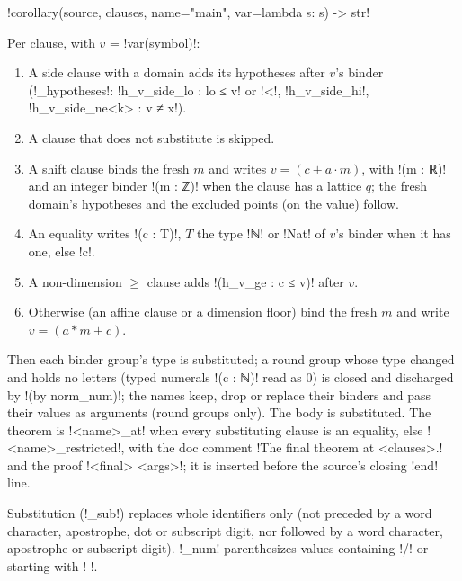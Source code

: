 {{{\begin{signature}
\lexpy!corollary(source, clauses, name="main", var=lambda s: s) -> str!
\end{signature}
\begin{algorithm}\label{alg:lean-export-corollary}
Per clause, with $v$ = \lexcode!var(symbol)!:
\begin{enumerate}
\item A side clause with a domain adds its hypotheses after $v$'s binder (\lexpy!_hypotheses!:
\lexcode!h_v_side_lo : lo ≤ v! or \lexcode!<!, \lexcode!h_v_side_hi!, \lexcode!h_v_side_ne<k> : v ≠ x!).
\item A clause that does not substitute is skipped.
\item A shift clause binds the fresh $m$ and writes $v = (c + a\cdot m)$, with
\lexlean!(m : ℝ)! and an integer binder \lexlean!(m : ℤ)! when the clause has a lattice $q$; the fresh
domain's hypotheses and the excluded points (on the value) follow.
\item An equality writes \lexlean!(c : T)!, $T$ the type \lexlean!ℕ! or \lexlean!Nat! of $v$'s binder when it has one, else
\lexcode!c!.
\item A non-dimension $\ge$ clause adds \lexlean!(h_v_ge : c ≤ v)! after $v$.
\item Otherwise (an affine clause or a dimension floor) bind the fresh $m$ and write
$v = (a * m + c)$.
\end{enumerate}
Then each binder group's type is substituted; a round group whose type changed and holds no letters (typed numerals \lexcode!(c : ℕ)! read as 0) is closed and discharged by \lexlean!(by norm_num)!; the names keep, drop or replace their
binders and pass their values as arguments (round groups only). The body is substituted. The
theorem is \lexlean!<name>_at! when every substituting clause is an equality, else
\lexlean!<name>_restricted!, with the doc comment \lexcode!The final theorem at <clauses>.! and the proof
\lexcode!<final> <args>!; it is inserted before the source's closing \lexcode!end! line.
\end{algorithm}
Substitution (\lexpy!_sub!) replaces whole identifiers only (not preceded by a word character,
apostrophe, dot or subscript digit, nor followed by a word character, apostrophe or subscript
digit). \lexpy!_num! parenthesizes values containing \lexcode!/! or starting with \lexcode!-!.

}}}
